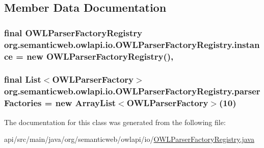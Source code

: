 \subsection{Member Data Documentation}
\hypertarget{classorg_1_1semanticweb_1_1owlapi_1_1io_1_1_o_w_l_parser_factory_registry_a055642829cbf896468fd6024e9f379e7}{
\subsubsection[{instance}]{\setlength{\rightskip}{0pt plus 5cm}final {\bf O\-W\-L\-Parser\-Factory\-Registry} org.\-semanticweb.\-owlapi.\-io.\-O\-W\-L\-Parser\-Factory\-Registry.\-instance = new {\bf O\-W\-L\-Parser\-Factory\-Registry}()\hspace{0.3cm}{\ttfamily [static]}, {\ttfamily [private]}}}\label{classorg_1_1semanticweb_1_1owlapi_1_1io_1_1_o_w_l_parser_factory_registry_a055642829cbf896468fd6024e9f379e7}
\hypertarget{classorg_1_1semanticweb_1_1owlapi_1_1io_1_1_o_w_l_parser_factory_registry_aac6622b19cf1dc11b9be77543473f8bc}{
\subsubsection[{parser\-Factories}]{\setlength{\rightskip}{0pt plus 5cm}final List$<${\bf O\-W\-L\-Parser\-Factory}$>$ org.\-semanticweb.\-owlapi.\-io.\-O\-W\-L\-Parser\-Factory\-Registry.\-parser\-Factories = new Array\-List$<${\bf O\-W\-L\-Parser\-Factory}$>$(10)\hspace{0.3cm}{\ttfamily [private]}}}\label{classorg_1_1semanticweb_1_1owlapi_1_1io_1_1_o_w_l_parser_factory_registry_aac6622b19cf1dc11b9be77543473f8bc}


The documentation for this class was generated from the following file\-:\begin{DoxyCompactItemize}
\item 
api/src/main/java/org/semanticweb/owlapi/io/\hyperlink{_o_w_l_parser_factory_registry_8java}{O\-W\-L\-Parser\-Factory\-Registry.\-java}\end{DoxyCompactItemize}
